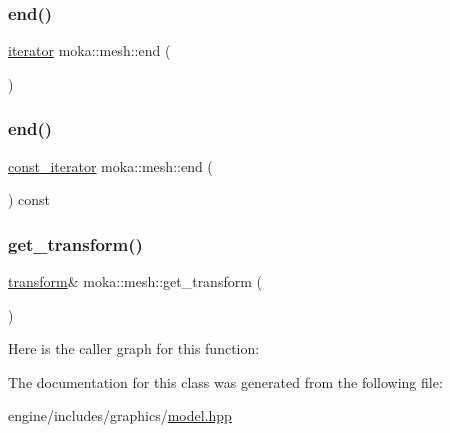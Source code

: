 \mbox{\label{classmoka_1_1mesh_aa42c177ac5f937f9de4e01efc79d9bc0}} 
\subsubsection{\texorpdfstring{end()}{end()}\hspace{0.1cm}{\footnotesize\ttfamily [1/2]}}
{\footnotesize\ttfamily \mbox{\hyperlink{classmoka_1_1mesh_a89827e48d6ebf6481c9a923042324756}{iterator}} moka\+::mesh\+::end (\begin{DoxyParamCaption}{ }\end{DoxyParamCaption})}

\mbox{\label{classmoka_1_1mesh_a13510c06aa885a3fa1cb8eb3d998a67b}} 
\subsubsection{\texorpdfstring{end()}{end()}\hspace{0.1cm}{\footnotesize\ttfamily [2/2]}}
{\footnotesize\ttfamily \mbox{\hyperlink{classmoka_1_1mesh_aea68be7cc8e79b9825775f199562bf90}{const\+\_\+iterator}} moka\+::mesh\+::end (\begin{DoxyParamCaption}{ }\end{DoxyParamCaption}) const}

\mbox{\label{classmoka_1_1mesh_a4068a7137917249d32c521d58c5754c4}} 
\subsubsection{\texorpdfstring{get\_transform()}{get\_transform()}}
{\footnotesize\ttfamily \mbox{\hyperlink{classmoka_1_1transform}{transform}}\& moka\+::mesh\+::get\+\_\+transform (\begin{DoxyParamCaption}{ }\end{DoxyParamCaption})}

Here is the caller graph for this function\+:


The documentation for this class was generated from the following file\+:\begin{DoxyCompactItemize}
\item 
engine/includes/graphics/\mbox{\hyperlink{model_8hpp}{model.\+hpp}}\end{DoxyCompactItemize}

